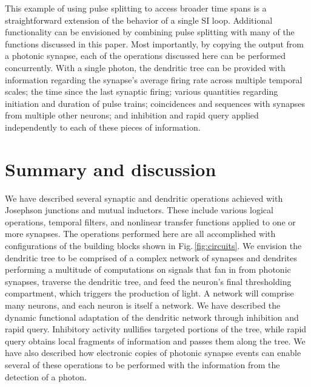 \documentclass[twocolumn]{article}
\begin{document}
This example of using pulse splitting to access broader time spans is a straightforward extension of the behavior of a single SI loop. Additional functionality can be envisioned by combining pulse splitting with many of the functions discussed in this paper. Most importantly, by copying the output from a photonic synapse, each of the operations discussed here can be performed concurrently. With a single photon, the dendritic tree can be provided with information regarding the synapse's average firing rate across multiple temporal scales; the time since the last synaptic firing; various quantities regarding initiation and duration of pulse trains; coincidences and sequences with synapses from multiple other neurons; and inhibition and rapid query applied independently to each of these pieces of information.

\section{\label{sec:discussion}Summary and discussion}
We have described several synaptic and dendritic operations achieved with Josephson junctions and mutual inductors. These include various logical operations, temporal filters, and nonlinear transfer functions applied to one or more synapses. The operations performed here are all accomplished with configurations of the building blocks shown in Fig.\,\ref{fig:circuits}. We envision the dendritic tree to be comprised of a complex network of synapses and dendrites performing a multitude of computations on signals that fan in from photonic synapses, traverse the dendritic tree, and feed the neuron's final thresholding compartment, which triggers the production of light. A network will comprise many neurons, and each neuron is itself a network. We have described the dynamic functional adaptation of the dendritic network through inhibition and rapid query. Inhibitory activity nullifies targeted portions of the tree, while rapid query obtains local fragments of information and passes them along the tree. We have also described how electronic copies of photonic synapse events can enable several of these operations to be performed with the information from the detection of a photon. 
\end{document}
